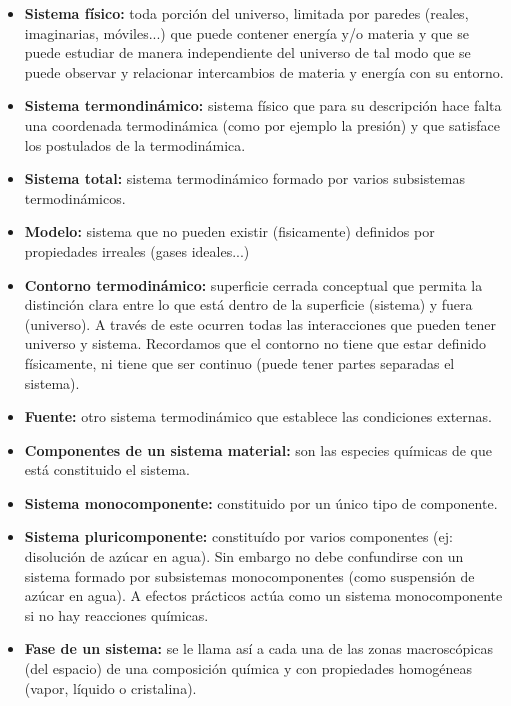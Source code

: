 \documentclass[12pt,a4paper]{article}
\begin{document}
\begin{itemize}

\item \textbf{Sistema físico:} toda porción del universo, limitada por paredes (reales, imaginarias, móviles...) que puede contener energía y/o materia y que se puede estudiar de manera independiente del universo de tal modo que se puede observar y relacionar intercambios de materia y energía con su entorno.

\item \textbf{Sistema termondinámico:} sistema físico que para su descripción hace falta una coordenada termodinámica (como por ejemplo la presión) y que satisface los postulados de la termodinámica.

\item \textbf{Sistema total:} sistema termodinámico formado por varios subsistemas termodinámicos.

\item \textbf{Modelo:} sistema que no pueden existir (fisicamente) definidos por propiedades irreales (gases ideales...)

\item \textbf{Contorno termodinámico:} superficie cerrada conceptual que permita la distinción clara entre lo que está dentro de la superficie (sistema) y fuera (universo). A través de este ocurren todas las interacciones que pueden tener universo y sistema. Recordamos que el contorno no tiene que estar definido físicamente, ni tiene que ser continuo (puede tener partes separadas el sistema).

\item \textbf{Fuente:} otro sistema termodinámico que establece las condiciones externas.

\item \textbf{Componentes de un sistema material:} son las especies químicas de que está constituido el sistema.

\item \textbf{Sistema monocomponente:} constituido por un único tipo de componente.

\item \textbf{Sistema pluricomponente:} constituído por varios componentes (ej: disolución de azúcar en agua). Sin embargo no debe confundirse con un sistema formado por subsistemas monocomponentes (como suspensión de azúcar en agua). A efectos prácticos actúa como un sistema monocomponente si no hay reacciones químicas.

\item \textbf{Fase de un sistema:} se le llama así a cada una de las zonas macroscópicas (del espacio) de una composición química y con propiedades homogéneas (vapor, líquido o cristalina).


\end{itemize}
\end{document}
